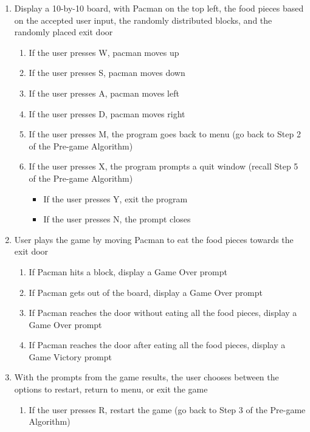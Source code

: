 \begin{enumerate}
    \item Display a 10-by-10 board, with Pacman on the top left, the food
        pieces based on the accepted user input, the randomly distributed
        blocks, and the randomly placed exit door
        \begin{enumerate}[label=\alph*]
            \item If the user presses W, pacman moves up
            \item If the user presses S, pacman moves down
            \item If the user presses A, pacman moves left
            \item If the user presses D, pacman moves right
            \item If the user presses M, the program goes back to menu (go back to Step 2 of the Pre-game Algorithm)
            \item If the user presses X, the program prompts a quit window (recall Step 5 of the Pre-game Algorithm)
            \begin{itemize}[label={}]
                \item If the user presses Y, exit the program
                \item If the user presses N, the prompt closes
            \end{itemize}
        \end{enumerate}
    \item User plays the game by moving Pacman to eat the food pieces towards the exit door
        \begin{enumerate}[label=\alph*]
            \item If Pacman hits a block, display a Game Over prompt
            \item If Pacman gets out of the board, display a Game Over prompt
            \item If Pacman reaches the door without eating all the food pieces, display a Game Over prompt
            \item If Pacman reaches the door after eating all the food pieces, display a Game Victory prompt
        \end{enumerate}
    \item With the prompts from the game results, the user chooses between the options to restart, return to menu, or exit the game
        \begin{enumerate}[label=\alph*]
            \item If the user presses R, restart the game (go back to Step 3 of the Pre-game Algorithm)

\end{enumerate}
\end{enumerate}

